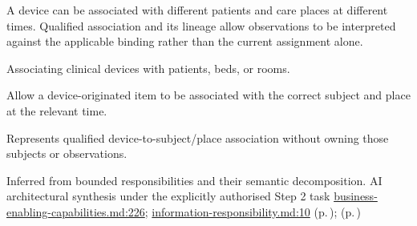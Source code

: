 A device can be associated with different patients and care places at different times. Qualified association and its lineage allow observations to be interpreted against the applicable binding rather than the current assignment alone.



Associating clinical devices with patients, beds, or rooms.



Allow a device-originated item to be associated with the correct subject and place at the relevant time.



Represents qualified device-to-subject/\allowbreak{}place association without owning those subjects or observations.


Inferred from bounded responsibilities and their semantic decomposition. AI architectural synthesis under the explicitly authorised Step 2 task \hyperref[evidence:e01893359d483acf]{business-enabling-capabilities.md:226}; \hyperref[evidence:be61392fefb4bb10]{information-responsibility.md:10}
 (p.\,\pageref{cap:bec-reviewed-device-utilisation-administration});  (p.\,\pageref{cap:bec-reviewed-device-oa-m-metadata-management})
